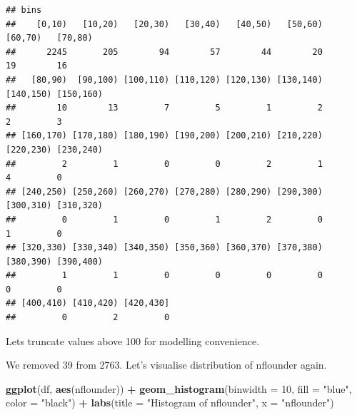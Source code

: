 \documentclass[
]{article}
\newenvironment{Shaded}{\begin{snugshade}}{\end{snugshade}}
\newcommand{\AttributeTok}[1]{\textcolor[rgb]{0.13,0.29,0.53}{#1}}
\newcommand{\ConstantTok}[1]{\textcolor[rgb]{0.56,0.35,0.01}{#1}}
\newcommand{\DecValTok}[1]{\textcolor[rgb]{0.00,0.00,0.81}{#1}}
\newcommand{\FunctionTok}[1]{\textcolor[rgb]{0.13,0.29,0.53}{\textbf{#1}}}
\newcommand{\NormalTok}[1]{#1}
\newcommand{\OtherTok}[1]{\textcolor[rgb]{0.56,0.35,0.01}{#1}}
\newcommand{\SpecialCharTok}[1]{\textcolor[rgb]{0.81,0.36,0.00}{\textbf{#1}}}
\newcommand{\StringTok}[1]{\textcolor[rgb]{0.31,0.60,0.02}{#1}}
\begin{document}
\begin{verbatim}
## bins
##    [0,10)   [10,20)   [20,30)   [30,40)   [40,50)   [50,60)   [60,70)   [70,80) 
##      2245       205        94        57        44        20        19        16 
##   [80,90)  [90,100) [100,110) [110,120) [120,130) [130,140) [140,150) [150,160) 
##        10        13         7         5         1         2         2         3 
## [160,170) [170,180) [180,190) [190,200) [200,210) [210,220) [220,230) [230,240) 
##         2         1         0         0         2         1         4         0 
## [240,250) [250,260) [260,270) [270,280) [280,290) [290,300) [300,310) [310,320) 
##         0         1         0         1         2         0         1         0 
## [320,330) [330,340) [340,350) [350,360) [360,370) [370,380) [380,390) [390,400) 
##         1         1         0         0         0         0         0         0 
## [400,410) [410,420) [420,430] 
##         0         2         0
\end{verbatim}

Lets truncate values above 100 for modelling convenience.

\begin{Shaded}
\end{Shaded}

We removed 39 from 2763. Let's visualise distribution of nflounder
again.

\begin{Shaded}
\begin{Highlighting}[]
\FunctionTok{ggplot}\NormalTok{(df, }\FunctionTok{aes}\NormalTok{(nflounder)) }\SpecialCharTok{+} 
  \FunctionTok{geom\_histogram}\NormalTok{(}\AttributeTok{binwidth =} \DecValTok{10}\NormalTok{, }\AttributeTok{fill =} \StringTok{"blue"}\NormalTok{, }\AttributeTok{color =} \StringTok{"black"}\NormalTok{) }\SpecialCharTok{+}
  \FunctionTok{labs}\NormalTok{(}\AttributeTok{title =} \StringTok{"Histogram of nflounder"}\NormalTok{, }\AttributeTok{x =} \StringTok{"nflounder"}\NormalTok{)}
\end{Highlighting}
\end{Shaded}
\end{document}
